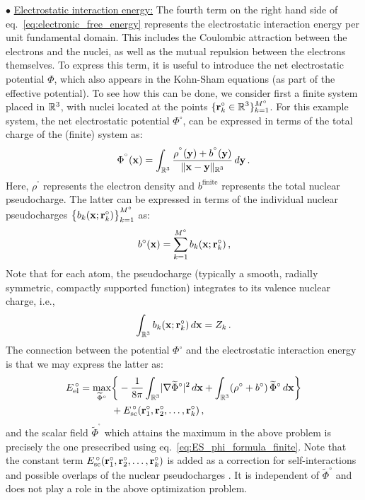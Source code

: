 \documentclass[preprint,12pt, 3p, sort&compress]{elsarticle}
\begin{document}
$\bullet$ \underline{Electrostatic interaction energy:} The fourth term on the right hand side of eq.~\ref{eq:electronic_free_energy} represents the electrostatic interaction energy per unit fundamental domain. This includes the Coulombic attraction between the electrons and the nuclei, as well as the mutual repulsion between the electrons themselves. To express this term, it is useful to introduce the net electrostatic potential $\Phi$, which also appears in the Kohn-Sham equations (as part of the effective potential). To see how this can be done, we consider first a finite system placed in $\mathbb{R}^3$, with nuclei located at the points $\displaystyle \{{\bf r}_k^{\circ} \in \mathbb{R}^3\}_{k=1}^{M^{\circ}}$. For this example system, the net electrostatic potential $\Phi^{\circ}$, can be expressed in terms of the total charge of the (finite) system as:
\begin{align}
\label{eq:ES_phi_formula_finite} 
\Phi^{^{\circ}}({\bf x}) = \int_{\mathbb{R}^3} \frac{\rho^{^{\circ}}({\bf y}) + b^{^{\circ}}({\bf y})}{\lVert{\bf x} - {\bf y}\rVert_{\mathbb{R}^3}}\,d{\bf y}\,.
\end{align}
Here, $\rho^{^{\circ}}$ represents the electron density and $ b^{\text{finite}}$ represents the total nuclear pseudocharge. The latter can be expressed in terms of the individual nuclear pseudocharges $\big\{b_k({\bf x};{\bf r}_k^{\circ})\big\}_{k=1}^{M^{\circ}}$ as:
\begin{align}
b^{{\circ}}({\bf x}) = \sum_{k=1}^{M^{\circ}}b_k({\bf x};{\bf r}_k^{\circ})\,, 
\end{align}
Note that for each atom, the pseudocharge (typically a smooth, radially symmetric, compactly supported function) integrates to its valence nuclear charge, i.e.,
\begin{align}
\int_{\mathbb{R}^3}b_k({\bf x};{\bf r}_k^{\circ})\,d{\bf x} = Z_k\,.
\end{align}
The connection between the potential $\Phi^{\circ}$ and the electrostatic interaction energy is that we may express the latter as:
\begin{align} 
\nonumber
{E}_{\text{el}}^{\,\circ} = \max_{\widetilde{\Phi}^{\circ} }&\bigg\{-\frac{1}{8\pi}\int_{\mathbb{R}^3}\lvert\nabla \widetilde{\Phi}^{\circ} \rvert^2\,d{\bf x} + \int_{\mathbb{R}^3}(\rho^{\circ}  + b^{\circ})\,\widetilde{\Phi}^{\circ}\,d{\bf x}\bigg\} \\ \label{eq:ES_finite}  &+ E_{\text{sc}}^{\,\circ}({\bf r}_1^{\circ},{\bf r}_2^{\circ},\ldots,{\bf r}_k^{\circ})\,,
\end{align}
and the scalar field $\widetilde{\Phi}^{^{\circ}}$ which attains the maximum in the above problem is precisely the one presecribed using eq.~\ref{eq:ES_phi_formula_finite}. Note that the constant term $E_{\text{sc}}^{\,\circ}({\bf r}_1^{\circ},{\bf r}_2^{\circ},\ldots,{\bf r}_k^{\circ})$ is added as a correction  for self-interactions and possible overlaps of the nuclear pseudocharges \citep{suryanarayana2014augmented}. It is independent of $\widetilde{\Phi}^{\circ}$ and does not play a role in the above optimization problem.
\end{document}
